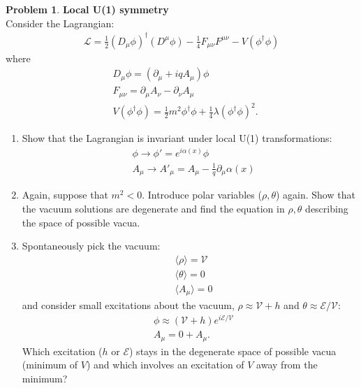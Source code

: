 \documentclass[a4paper,11pt]{article}
\numberwithin{equation}{section}
\theoremstyle{definition}
\newtheorem{prob}{Problem}[section]
\newcommand{\p}{\partial}
\newcommand{\lag}{\mathcal{L}}
\begin{document}
\newpage















\begin{prob}\textbf{Local U(1) symmetry}\\
	
	Consider the Lagrangian:
	\begin{align}
	\lag = \frac{1}{2}(D_\mu\phi)^\dagger(D^\mu\phi) - \frac{1}{4}F_{\mu\nu}F^{\mu\nu} - V(\phi^\dagger\phi)
	\end{align}
	where 
	\begin{align}
	&D_\mu\phi = (\p_\mu + iq A_\mu)\phi\\
	&F_{\mu\nu} = \p_\mu A_\nu - \p_\nu A_\mu\\
	&V(\phi^\dagger\phi) = \frac{1}{2}m^2 \phi^\dagger\phi + \frac{1}{4}\lambda(\phi^\dagger\phi)^2.
	\end{align}
	\begin{enumerate}
		\item Show that the Lagrangian is invariant under local U(1) transformations:
		\begin{align}
		&\phi \to \phi' = e^{i\alpha(x)}\phi\\
		&A_\mu \to A'_\mu = A_\mu - \frac{1}{q}\p_\mu\alpha(x)
		\end{align}
		
		
		
		\item Again, suppose that $m^2 < 0$. Introduce polar variables ($\rho,\theta$) again. Show that the vacuum solutions are degenerate and find the equation in $\rho, \theta$ describing the space of possible vacua.\\
		
		\item Spontaneously pick the vacuum:
		\begin{align}
		&\langle \rho \rangle = \mathcal{V}\\
		&\langle \theta \rangle = 0\\
		&\langle A_\mu \rangle = 0
		\end{align}
		and consider small excitations about the vacuum, $\rho \approx \mathcal{V} + h$ and $\theta \approx \mathcal{E}/\mathcal{V}$:
		\begin{align}
		&\phi \approx (\mathcal{V}+ h)e^{i\mathcal{E}/\mathcal{V}}\\
		&A_\mu = 0 + A_\mu.
		\end{align}
		Which excitation ($h$ or $\mathcal{E}$) stays in the degenerate space of possible vacua (minimum of $V$) and which involves an excitation of $V$ away from the minimum?\\
		

\end{enumerate}
\end{prob}
\end{document}
